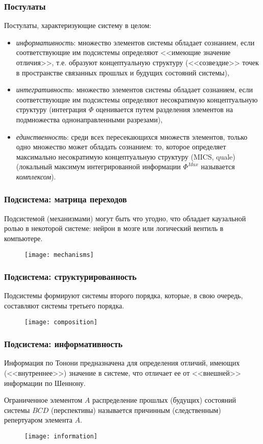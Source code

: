 \documentclass[default]{beamer}
\begin{document}
	\begin{frame}
		\frametitle{Постулаты}
		
		Постулаты, характеризующие систему в целом:
		\begin{itemize}
			\item \textit{информативность}: множество элементов системы обладает сознанием, если соответствующие им подсистемы определяют <<имеющие значение отличия>>, т.е. образуют концептуальную структуру (<<созвездие>> точек в пространстве связанных прошлых и будущих состояний системы),
			\item \textit{интегративность}: множество элементов системы обладает сознанием, если соответствующие им подсистемы определяют несократимую концептуальную структуру (интеграция $\Phi$ оценивается путем разделения элементов на подмножества однонаправленными разрезами),
			\item \textit{единственность}: среди всех пересекающихся множеств элементов, только одно множество может обладать сознанием: то, которое определяет максимально несократимую концептуальную структуру (MICS, quale) (локальный максимум интегрированной информации $\Phi^{Max}$ называется \textit{комплексом}).
		\end{itemize}
	\end{frame}
	
	\begin{frame}
		\frametitle{Подсистема: матрица переходов}

		Подсистемой (механизмами) могут быть что угодно, что обладает каузальной ролью в некоторой системе: нейрон в мозге или логический вентиль в компьютере.
		
		\begin{figure}
			\texttt{[image: mechanisms]}
		\end{figure}
	\end{frame}
				
	\begin{frame}
		\frametitle{Подсистема: структурированность}
		
		Подсистемы формируют системы второго порядка, которые, в свою очередь, составляют системы третьего порядка.
		
		\begin{figure}
			\texttt{[image: composition]}
		\end{figure}
	\end{frame}

	\begin{frame}
		\frametitle{Подсистема: информативность}
		
		Информация по Тонони предназначена для определения отличий, имеющих (<<внутреннее>>) значение в системе, что отличает ее от <<внешней>> информации по Шеннону.
		\par\bigskip
		Ограниченное элементом $A$ распределение прошлых (будущих) состояний системы $BCD$ (перспективы) называется причинным (следственным) репертуаром элемента $A$.
		
		\begin{figure}
			\texttt{[image: information]}
		\end{figure}
	\end{frame}
			
\end{document}
